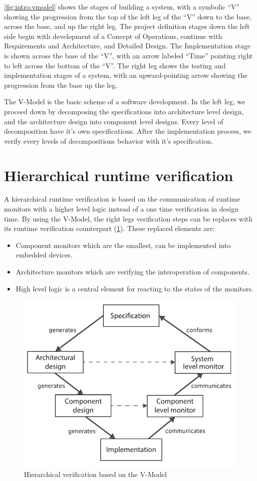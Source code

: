 \cref{fig:intro:vmodel} shows the stages of building a system, with a symbolic “V” showing the progression from the top of the left leg of the ``V'' down to the base, across the base, and up the right leg. The project definition stages down the left side begin with development of a Concept of Operations, continue with Requirements and Architecture, and Detailed Design. The Implementation stage is shown across the base of the ``V'', with an arrow labeled ``Time'' pointing right to left across the bottom of the ``V''. The right leg shows the testing and implementation stages of a system, with an upward-pointing arrow showing the progression from the base up the leg. \cite{vmodel}

The V-Model is the basic scheme of a software development. In the left leg, we proceed down by decomposing the specifications into architecture level design, and the architecture design into component level designs. Every level of decomposition have it's own specifications. After the implementation process, we verify every levels of decompositions behavior with it's specification.

\section{Hierarchical runtime verification}

A hierarchical runtime verification is based on the communication of runtime monitors with a higher level logic instead of a one time verification in design time. By using the V-Model, the right legs verification steps can be replaces with its runtime verification counterpart (\cref{fig:intro:rvmodel}).
These replaced elements are:
\begin{itemize}
	\item Component monitors which are the smallest, can be implemented into embedded devices.
	\item Architecture monitors which are verifying the interoperation of components.
	\item High level logic is a central element for reacting to the states of the monitors.
\end{itemize}

\begin{figure}[h]
	\centering
	\includegraphics[width=0.8\linewidth]{include/figures/chapter_1/rv_vmodel}
	\caption{Hierarchical verification based on the V-Model}
	\label{fig:intro:rvmodel}
\end{figure}

